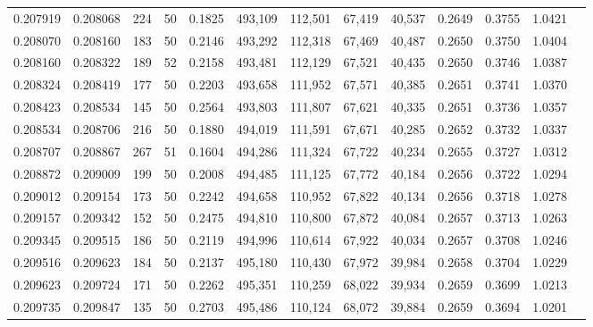 \begin{tabular}{rrrrrrrrrrrrr}
0.207919 & 0.208068 &   224 &  50 &                                     0.1825 & 493,109 & 112,501 &  67,419 &  40,537 & 0.2649 & 0.3755 & 1.0421 \\
0.208070 & 0.208160 &   183 &  50 &                                     0.2146 & 493,292 & 112,318 &  67,469 &  40,487 & 0.2650 & 0.3750 & 1.0404 \\
0.208160 & 0.208322 &   189 &  52 &                                     0.2158 & 493,481 & 112,129 &  67,521 &  40,435 & 0.2650 & 0.3746 & 1.0387 \\
0.208324 & 0.208419 &   177 &  50 &                                     0.2203 & 493,658 & 111,952 &  67,571 &  40,385 & 0.2651 & 0.3741 & 1.0370 \\
0.208423 & 0.208534 &   145 &  50 &                                     0.2564 & 493,803 & 111,807 &  67,621 &  40,335 & 0.2651 & 0.3736 & 1.0357 \\
0.208534 & 0.208706 &   216 &  50 &                                     0.1880 & 494,019 & 111,591 &  67,671 &  40,285 & 0.2652 & 0.3732 & 1.0337 \\
0.208707 & 0.208867 &   267 &  51 &                                     0.1604 & 494,286 & 111,324 &  67,722 &  40,234 & 0.2655 & 0.3727 & 1.0312 \\
0.208872 & 0.209009 &   199 &  50 &                                     0.2008 & 494,485 & 111,125 &  67,772 &  40,184 & 0.2656 & 0.3722 & 1.0294 \\
0.209012 & 0.209154 &   173 &  50 &                                     0.2242 & 494,658 & 110,952 &  67,822 &  40,134 & 0.2656 & 0.3718 & 1.0278 \\
0.209157 & 0.209342 &   152 &  50 &                                     0.2475 & 494,810 & 110,800 &  67,872 &  40,084 & 0.2657 & 0.3713 & 1.0263 \\
0.209345 & 0.209515 &   186 &  50 &                                     0.2119 & 494,996 & 110,614 &  67,922 &  40,034 & 0.2657 & 0.3708 & 1.0246 \\
0.209516 & 0.209623 &   184 &  50 &                                     0.2137 & 495,180 & 110,430 &  67,972 &  39,984 & 0.2658 & 0.3704 & 1.0229 \\
0.209623 & 0.209724 &   171 &  50 &                                     0.2262 & 495,351 & 110,259 &  68,022 &  39,934 & 0.2659 & 0.3699 & 1.0213 \\
0.209735 & 0.209847 &   135 &  50 &                                     0.2703 & 495,486 & 110,124 &  68,072 &  39,884 & 0.2659 & 0.3694 & 1.0201 \\

\end{tabular}
